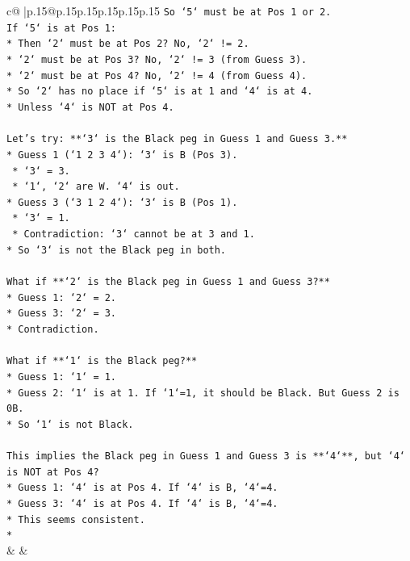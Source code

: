 \documentclass{article}
\begin{document}
{\begin{supertabular}{c@{$\;$}|p{.15\linewidth}@{}p{.15\linewidth}p{.15\linewidth}p{.15\linewidth}p{.15\linewidth}p{.15\linewidth}}
{{{\texttt{So `5` must be at Pos 1 or 2.} \\
\texttt{If `5` is at Pos 1:} \\
\texttt{*   Then `2` must be at Pos 2? No, `2` != 2.} \\
\texttt{*   `2` must be at Pos 3? No, `2` != 3 (from Guess 3).} \\
\texttt{*   `2` must be at Pos 4? No, `2` != 4 (from Guess 4).} \\
\texttt{*   So `2` has no place if `5` is at 1 and `4` is at 4.} \\
\texttt{*   Unless `4` is NOT at Pos 4.} \\
\\ 
\texttt{Let's try: **`3` is the Black peg in Guess 1 and Guess 3.**} \\
\texttt{*   Guess 1 (`1 2 3 4`): `3` is B (Pos 3).} \\
\texttt{    *   `3` = 3.} \\
\texttt{    *   `1`, `2` are W. `4` is out.} \\
\texttt{*   Guess 3 (`3 1 2 4`): `3` is B (Pos 1).} \\
\texttt{    *   `3` = 1.} \\
\texttt{    *   Contradiction: `3` cannot be at 3 and 1.} \\
\texttt{*   So `3` is not the Black peg in both.} \\
\\ 
\texttt{What if **`2` is the Black peg in Guess 1 and Guess 3?**} \\
\texttt{*   Guess 1: `2` = 2.} \\
\texttt{*   Guess 3: `2` = 3.} \\
\texttt{*   Contradiction.} \\
\\ 
\texttt{What if **`1` is the Black peg?**} \\
\texttt{*   Guess 1: `1` = 1.} \\
\texttt{*   Guess 2: `1` is at 1. If `1`=1, it should be Black. But Guess 2 is 0B.} \\
\texttt{*   So `1` is not Black.} \\
\\ 
\texttt{This implies the Black peg in Guess 1 and Guess 3 is **`4`**, but `4` is NOT at Pos 4?} \\
\texttt{*   Guess 1: `4` is at Pos 4. If `4` is B, `4`=4.} \\
\texttt{*   Guess 3: `4` is at Pos 4. If `4` is B, `4`=4.} \\
\texttt{*   This seems consistent.} \\
\texttt{*} \\
            }
        }
    }
    & & \\ \\


\end{supertabular}}
\end{document}
